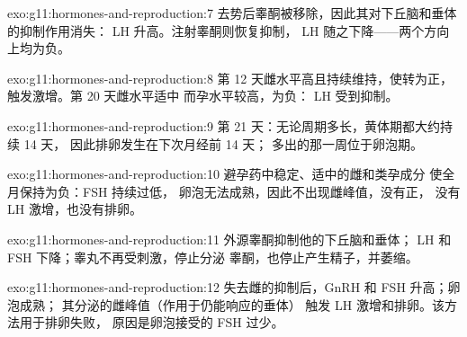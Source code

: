 \begin{solution}{exo:g11:hormones-and-reproduction:7}
去势后睾酮被移除，因此其对下丘脑和垂体的抑制作用消失：
LH 升高。注射睾酮则恢复抑制，
LH 随之下降——两个方向上均为负。
\end{solution}

\begin{solution}{exo:g11:hormones-and-reproduction:8}
第 12 天雌水平高且持续维持，使转为正，
触发激增。第 20 天雌水平适中
而孕水平较高，为负：
LH 受到抑制。
\end{solution}

\begin{solution}{exo:g11:hormones-and-reproduction:9}
第 21 天：无论周期多长，黄体期都大约持续 14 天，
因此排卵发生在下次月经前 14 天；
多出的那一周位于卵泡期。
\end{solution}

\begin{solution}{exo:g11:hormones-and-reproduction:10}
避孕药中稳定、适中的雌和类孕成分
使全月保持为负：FSH 持续过低，
卵泡无法成熟，因此不出现雌峰值，没有正，
没有 LH 激增，也没有排卵。
\end{solution}

\begin{solution}{exo:g11:hormones-and-reproduction:11}
外源睾酮抑制他的下丘脑和垂体；
LH 和 FSH 下降；睾丸不再受刺激，停止分泌
睾酮，也停止产生精子，并萎缩。
\end{solution}

\begin{solution}{exo:g11:hormones-and-reproduction:12}
失去雌的抑制后，GnRH 和 FSH 升高；卵泡成熟；
其分泌的雌峰值（作用于仍能响应的垂体）
触发 LH 激增和排卵。该方法用于排卵失败，
原因是卵泡接受的 FSH 过少。
\end{solution}

